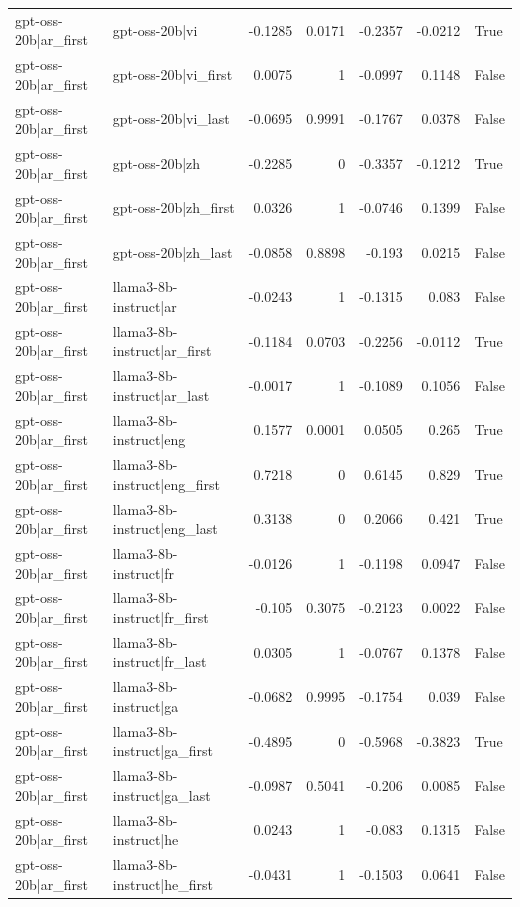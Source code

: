 \begin{table}
\begin{tabular}{l l r r r r l}
gpt-oss-20b|ar_first & gpt-oss-20b|vi & -0.1285 & 0.0171 & -0.2357 & -0.0212 & True \\
gpt-oss-20b|ar_first & gpt-oss-20b|vi_first & 0.0075 & 1 & -0.0997 & 0.1148 & False \\
gpt-oss-20b|ar_first & gpt-oss-20b|vi_last & -0.0695 & 0.9991 & -0.1767 & 0.0378 & False \\
gpt-oss-20b|ar_first & gpt-oss-20b|zh & -0.2285 & 0 & -0.3357 & -0.1212 & True \\
gpt-oss-20b|ar_first & gpt-oss-20b|zh_first & 0.0326 & 1 & -0.0746 & 0.1399 & False \\
gpt-oss-20b|ar_first & gpt-oss-20b|zh_last & -0.0858 & 0.8898 & -0.193 & 0.0215 & False \\
gpt-oss-20b|ar_first & llama3-8b-instruct|ar & -0.0243 & 1 & -0.1315 & 0.083 & False \\
gpt-oss-20b|ar_first & llama3-8b-instruct|ar_first & -0.1184 & 0.0703 & -0.2256 & -0.0112 & True \\
gpt-oss-20b|ar_first & llama3-8b-instruct|ar_last & -0.0017 & 1 & -0.1089 & 0.1056 & False \\
gpt-oss-20b|ar_first & llama3-8b-instruct|eng & 0.1577 & 0.0001 & 0.0505 & 0.265 & True \\
gpt-oss-20b|ar_first & llama3-8b-instruct|eng_first & 0.7218 & 0 & 0.6145 & 0.829 & True \\
gpt-oss-20b|ar_first & llama3-8b-instruct|eng_last & 0.3138 & 0 & 0.2066 & 0.421 & True \\
gpt-oss-20b|ar_first & llama3-8b-instruct|fr & -0.0126 & 1 & -0.1198 & 0.0947 & False \\
gpt-oss-20b|ar_first & llama3-8b-instruct|fr_first & -0.105 & 0.3075 & -0.2123 & 0.0022 & False \\
gpt-oss-20b|ar_first & llama3-8b-instruct|fr_last & 0.0305 & 1 & -0.0767 & 0.1378 & False \\
gpt-oss-20b|ar_first & llama3-8b-instruct|ga & -0.0682 & 0.9995 & -0.1754 & 0.039 & False \\
gpt-oss-20b|ar_first & llama3-8b-instruct|ga_first & -0.4895 & 0 & -0.5968 & -0.3823 & True \\
gpt-oss-20b|ar_first & llama3-8b-instruct|ga_last & -0.0987 & 0.5041 & -0.206 & 0.0085 & False \\
gpt-oss-20b|ar_first & llama3-8b-instruct|he & 0.0243 & 1 & -0.083 & 0.1315 & False \\
gpt-oss-20b|ar_first & llama3-8b-instruct|he_first & -0.0431 & 1 & -0.1503 & 0.0641 & False \\

\end{tabular}
\end{table}
